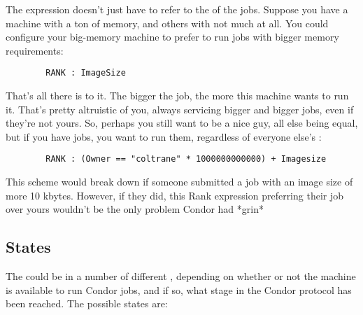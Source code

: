 The  expression doesn't just have to refer to the
 of the jobs.  Suppose you have a machine with a ton of
memory, and others with not much at all.  You could configure your
big-memory machine to prefer to run jobs with bigger memory
requirements:

\begin{verbatim}
        RANK : ImageSize
\end{verbatim}

That's all there is to it.  The bigger the job, the more this machine
wants to run it.  That's pretty altruistic of you, always servicing
bigger and bigger jobs, even if they're not yours.  So, perhaps you
still want to be a nice guy, all else being equal, but if you have
jobs, you want to run them, regardless of everyone else's
:

\begin{verbatim}
        RANK : (Owner == "coltrane" * 1000000000000) + Imagesize
\end{verbatim}

This scheme would break down if someone submitted a job with an image
size of more 10 kbytes.  However, if they did, this Rank expression
preferring their job over yours wouldn't be the only problem Condor had
*grin* 

\subsection{ States}
\label{sec:States}

The  could be in a number of different ,
depending on whether or not the machine is available to run Condor
jobs, and if so, what stage in the Condor protocol has been reached.
The possible states are:


